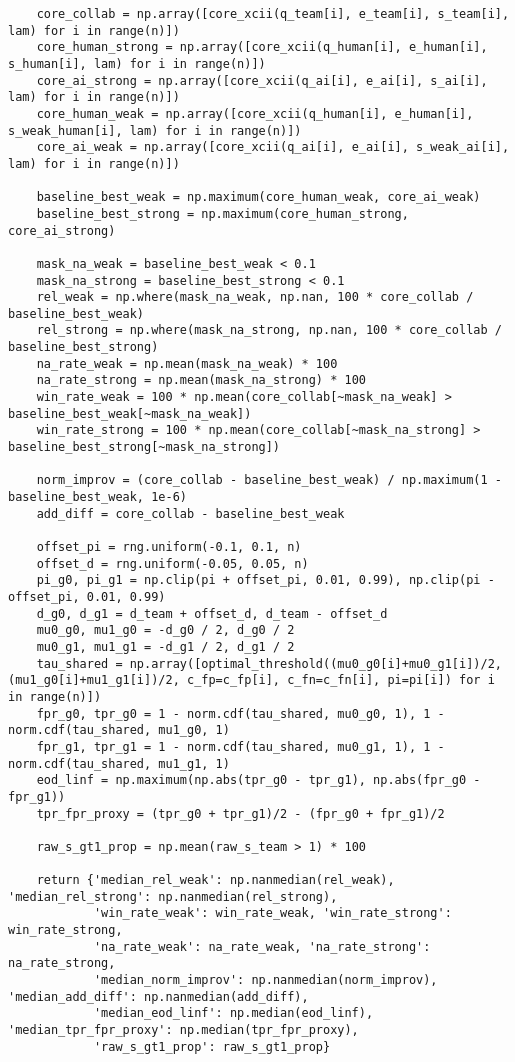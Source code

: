 \documentclass[a4paper]{article}
\begin{document}
\begin{verbatim}
    core_collab = np.array([core_xcii(q_team[i], e_team[i], s_team[i], lam) for i in range(n)])
    core_human_strong = np.array([core_xcii(q_human[i], e_human[i], s_human[i], lam) for i in range(n)])
    core_ai_strong = np.array([core_xcii(q_ai[i], e_ai[i], s_ai[i], lam) for i in range(n)])
    core_human_weak = np.array([core_xcii(q_human[i], e_human[i], s_weak_human[i], lam) for i in range(n)])
    core_ai_weak = np.array([core_xcii(q_ai[i], e_ai[i], s_weak_ai[i], lam) for i in range(n)])
    
    baseline_best_weak = np.maximum(core_human_weak, core_ai_weak)
    baseline_best_strong = np.maximum(core_human_strong, core_ai_strong)
    
    mask_na_weak = baseline_best_weak < 0.1
    mask_na_strong = baseline_best_strong < 0.1
    rel_weak = np.where(mask_na_weak, np.nan, 100 * core_collab / baseline_best_weak)
    rel_strong = np.where(mask_na_strong, np.nan, 100 * core_collab / baseline_best_strong)
    na_rate_weak = np.mean(mask_na_weak) * 100
    na_rate_strong = np.mean(mask_na_strong) * 100
    win_rate_weak = 100 * np.mean(core_collab[~mask_na_weak] > baseline_best_weak[~mask_na_weak])
    win_rate_strong = 100 * np.mean(core_collab[~mask_na_strong] > baseline_best_strong[~mask_na_strong])
    
    norm_improv = (core_collab - baseline_best_weak) / np.maximum(1 - baseline_best_weak, 1e-6)
    add_diff = core_collab - baseline_best_weak
    
    offset_pi = rng.uniform(-0.1, 0.1, n)
    offset_d = rng.uniform(-0.05, 0.05, n)
    pi_g0, pi_g1 = np.clip(pi + offset_pi, 0.01, 0.99), np.clip(pi - offset_pi, 0.01, 0.99)
    d_g0, d_g1 = d_team + offset_d, d_team - offset_d
    mu0_g0, mu1_g0 = -d_g0 / 2, d_g0 / 2
    mu0_g1, mu1_g1 = -d_g1 / 2, d_g1 / 2
    tau_shared = np.array([optimal_threshold((mu0_g0[i]+mu0_g1[i])/2, (mu1_g0[i]+mu1_g1[i])/2, c_fp=c_fp[i], c_fn=c_fn[i], pi=pi[i]) for i in range(n)])
    fpr_g0, tpr_g0 = 1 - norm.cdf(tau_shared, mu0_g0, 1), 1 - norm.cdf(tau_shared, mu1_g0, 1)
    fpr_g1, tpr_g1 = 1 - norm.cdf(tau_shared, mu0_g1, 1), 1 - norm.cdf(tau_shared, mu1_g1, 1)
    eod_linf = np.maximum(np.abs(tpr_g0 - tpr_g1), np.abs(fpr_g0 - fpr_g1))
    tpr_fpr_proxy = (tpr_g0 + tpr_g1)/2 - (fpr_g0 + fpr_g1)/2
    
    raw_s_gt1_prop = np.mean(raw_s_team > 1) * 100
    
    return {'median_rel_weak': np.nanmedian(rel_weak), 'median_rel_strong': np.nanmedian(rel_strong),
            'win_rate_weak': win_rate_weak, 'win_rate_strong': win_rate_strong,
            'na_rate_weak': na_rate_weak, 'na_rate_strong': na_rate_strong,
            'median_norm_improv': np.nanmedian(norm_improv), 'median_add_diff': np.nanmedian(add_diff),
            'median_eod_linf': np.median(eod_linf), 'median_tpr_fpr_proxy': np.median(tpr_fpr_proxy),
            'raw_s_gt1_prop': raw_s_gt1_prop}


\end{verbatim}
\end{document}
